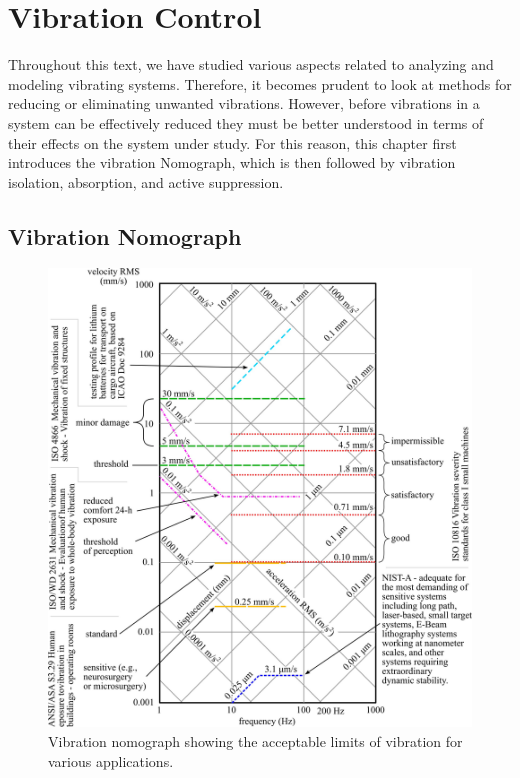 \documentclass[12pt,letter]{article}
\begin{document}
	
	\setcounter{section}{5}	
	\setcounter{figure}{0}   
	\renewcommand\thefigure{\thesection.\arabic{figure}}
	\setcounter{equation}{0}   
	\renewcommand\theequation{\thesection.\arabic{equation}}

	\section{Vibration Control}

Throughout this text, we have studied various aspects related to analyzing and modeling vibrating systems. Therefore, it becomes prudent to look at methods for reducing or eliminating unwanted vibrations. However, before vibrations in a system can be effectively reduced they must be better understood in terms of their effects on the system under study. For this reason, this chapter first introduces the vibration Nomograph, which is then followed by vibration isolation, absorption, and active suppression.  

\subsection{Vibration Nomograph}

\begin{figure}[tp!]
    \centering
    \includegraphics[width=6.5in]{../figures/Vibration_nomograph}
    \caption{Vibration nomograph showing the acceptable limits of vibration for various applications.}
    \label{fig:Vibration_nomograph}
\end{figure}
\end{document}
